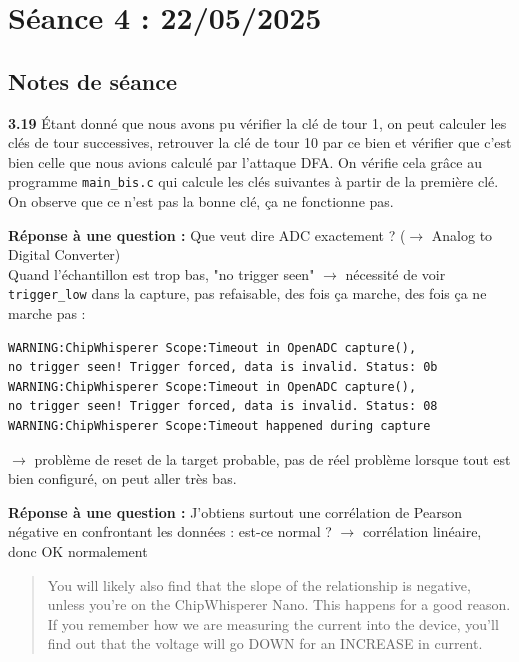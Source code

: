 \documentclass[12pt]{article}
\begin{document}
	
	\section{Séance 4 : 22/05/2025}
	\subsection{Notes de séance}
	\noindent \textbf{3.19} \'Etant donné que nous avons pu vérifier la clé de tour 1, on peut calculer les clés de tour successives, retrouver la clé de tour 10 par ce bien et vérifier que c'est bien celle que nous avions calculé par l'attaque DFA. On vérifie cela grâce au programme \verb|main_bis.c| qui calcule les clés suivantes à partir de la première clé. On observe que ce n'est pas la bonne clé, ça ne fonctionne pas. 
	
	\noindent \textbf{Réponse à une question :} Que veut dire ADC exactement ? ($\rightarrow$ Analog to Digital Converter) \\ Quand l'échantillon est trop bas, "no trigger seen" $\rightarrow$ nécessité de voir \verb|trigger_low| dans la capture, pas refaisable, des fois ça marche, des fois ça ne marche pas :
	\begin{lstlisting}
WARNING:ChipWhisperer Scope:Timeout in OpenADC capture(),
no trigger seen! Trigger forced, data is invalid. Status: 0b
WARNING:ChipWhisperer Scope:Timeout in OpenADC capture(),
no trigger seen! Trigger forced, data is invalid. Status: 08
WARNING:ChipWhisperer Scope:Timeout happened during capture
	\end{lstlisting}
	$\rightarrow$ problème de reset de la target probable, pas de réel problème lorsque tout est bien configuré, on peut aller très bas.
	
	\noindent \textbf{Réponse à une question :} J'obtiens surtout une corrélation de Pearson négative en confrontant les données : est-ce normal ? $\rightarrow$ corrélation linéaire, donc OK normalement
	\begin{quote}
		You will likely also find that the slope of the relationship is negative, unless you're on the ChipWhisperer Nano. This happens for a good reason. If you remember how we are measuring the current into the device, you'll find out that the voltage will go DOWN for an INCREASE in current.
	\end{quote}
	
\end{document}
